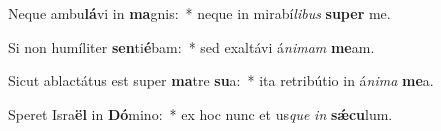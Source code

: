 \item Neque ambu\textbf{lá}vi in \textbf{ma}gnis:~* neque in mirabí\textit{li}\textit{bus} \textbf{su}\textbf{per} me.
\item Si non humíliter \textbf{sen}ti\textbf{é}bam:~* sed exaltávi á\textit{ni}\textit{mam} \textbf{me}am.
\item Sicut ablactátus est super \textbf{ma}tre \textbf{su}a:~* ita retribútio in á\textit{ni}\textit{ma} \textbf{me}a.
\item Speret Isra\textbf{ël} in \textbf{Dó}mino:~* ex hoc nunc et us\textit{que} \textit{in} \textbf{sǽ}\textbf{cu}lum.
